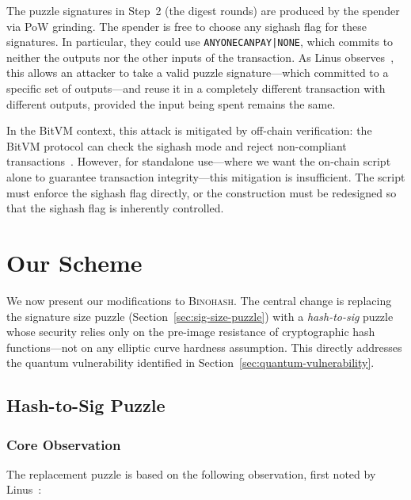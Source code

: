 \documentclass[11pt, a4paper]{article}
\begin{document}
The puzzle signatures in Step~2 (the digest rounds) are produced by the spender via PoW grinding. The spender is free to choose any sighash flag for these signatures. In particular, they could use \texttt{ANYONECANPAY|NONE}, which commits to neither the outputs nor the other inputs of the transaction. As Linus observes~\cite[Section~7.1]{linus2024binohash}, this allows an attacker to take a valid puzzle signature---which committed to a specific set of outputs---and reuse it in a completely different transaction with different outputs, provided the input being spent remains the same.

In the BitVM context, this attack is mitigated by off-chain verification: the BitVM protocol can check the sighash mode and reject non-compliant transactions~\cite[Section~7.1]{linus2024binohash}. However, for standalone use---where we want the on-chain script alone to guarantee transaction integrity---this mitigation is insufficient. The script must enforce the sighash flag directly, or the construction must be redesigned so that the sighash flag is inherently controlled.

\section{Our Scheme}
\label{sec:scheme}

We now present our modifications to \textsc{Binohash}. The central change is replacing the signature size puzzle (Section~\ref{sec:sig-size-puzzle}) with a \emph{hash-to-sig} puzzle whose security relies only on the pre-image resistance of cryptographic hash functions---not on any elliptic curve hardness assumption. This directly addresses the quantum vulnerability identified in Section~\ref{sec:quantum-vulnerability}.

\subsection{Hash-to-Sig Puzzle}
\label{sec:hash-puzzle}

\subsubsection{Core Observation}

The replacement puzzle is based on the following observation, first noted by Linus~\cite{linus2024sha2ecdsa}:
\end{document}
